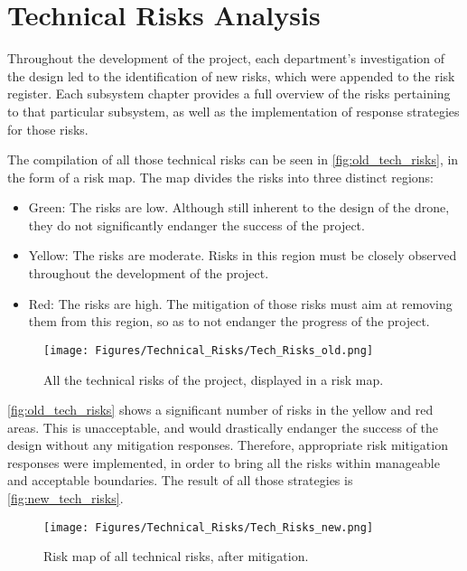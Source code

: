 \section{Technical Risks Analysis}

Throughout the development of the project, each department's investigation of the design led to the identification of new risks, which were appended to the risk register. Each subsystem chapter provides a full overview of the risks pertaining to that particular subsystem, as well as the implementation of response strategies for those risks.

The compilation of all those technical risks can be seen in \autoref{fig:old_tech_risks}, in the form of a risk map. The map divides the risks into three distinct regions:

\begin{itemize}[noitemsep]
    \item Green: The risks are low. Although still inherent to the design of the drone, they do not significantly endanger the success of the project.
    \item Yellow: The risks are moderate. Risks in this region must be closely observed throughout the development of the project.
    \item Red: The risks are high. The mitigation of those risks must aim at removing them from this region, so as to not endanger the progress of the project.
\end{itemize}

\begin{figure}
    \centering
    \texttt{[image: Figures/Technical\_Risks/Tech\_Risks\_old.png]}
    \caption{All the technical risks of the project, displayed in a risk map.}
    \label{fig:old_tech_risks}
\end{figure}

\autoref{fig:old_tech_risks} shows a significant number of risks in the yellow and red areas. This is unacceptable, and would drastically endanger the success of the design without any mitigation responses. Therefore, appropriate risk mitigation responses were implemented, in order to bring all the risks within manageable and acceptable boundaries. The result of all those strategies is \autoref{fig:new_tech_risks}.

\begin{figure}
    \centering
    \texttt{[image: Figures/Technical\_Risks/Tech\_Risks\_new.png]}
    \caption{Risk map of all technical risks, after mitigation.}
    \label{fig:new_tech_risks}
\end{figure}


